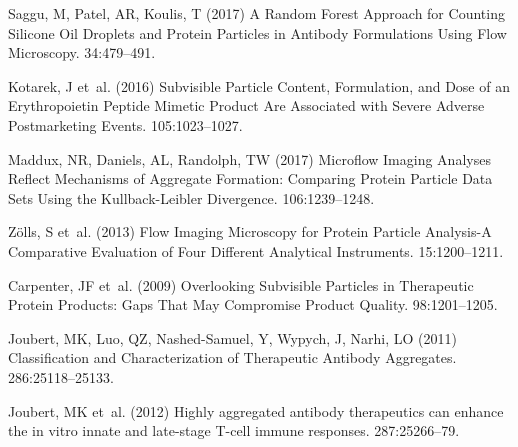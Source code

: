 \documentclass[%
reprint,
superscriptaddress,
 aps,
 pre,
]{revtex4-1}
\begin{document}

% 




\begin{thebibliography}{10}

Saggu, M, Patel, AR, Koulis, T
\newblock (2017) {A Random Forest Approach for Counting Silicone Oil Droplets
  and Protein Particles in Antibody Formulations Using Flow Microscopy}.
 34:479--491.

Kotarek, J et~al.
\newblock (2016) {Subvisible Particle Content, Formulation, and Dose of an
  Erythropoietin Peptide Mimetic Product Are Associated with Severe Adverse
  Postmarketing Events}.
 105:1023--1027.

Maddux, NR, Daniels, AL, Randolph, TW
\newblock (2017) {Microflow Imaging Analyses Reflect Mechanisms of Aggregate
  Formation: Comparing Protein Particle Data Sets Using the Kullback-Leibler
  Divergence}.
 106:1239--1248.

Z{\"{o}}lls, S et~al.
\newblock (2013) {Flow Imaging Microscopy for Protein Particle Analysis-A
  Comparative Evaluation of Four Different Analytical Instruments.}
 15:1200--1211.

Carpenter, JF et~al.
\newblock (2009) {Overlooking Subvisible Particles in Therapeutic Protein
  Products: Gaps That May Compromise Product Quality}.
 98:1201--1205.

Joubert, MK, Luo, QZ, Nashed-Samuel, Y, Wypych, J, Narhi, LO
\newblock (2011) {Classification and Characterization of Therapeutic Antibody
  Aggregates}.
 286:25118--25133.

Joubert, MK et~al.
\newblock (2012) {Highly aggregated antibody therapeutics can enhance the in
  vitro innate and late-stage T-cell immune responses.}
 287:25266--79.


\end{thebibliography}
\end{document}
